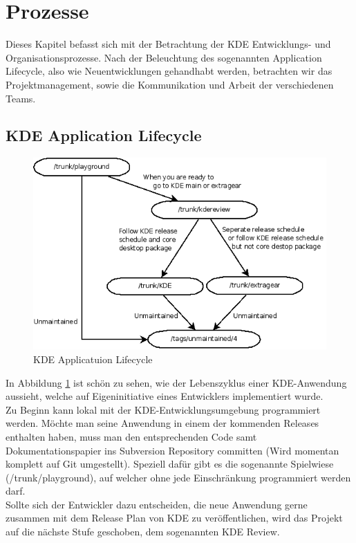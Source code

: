 \documentclass[10pt,a4paper,twocolumn]{article}
\begin{document}
	
\section{Prozesse}
Dieses Kapitel befasst sich mit der Betrachtung der KDE Entwicklungs- und Organisationsprozesse. Nach der Beleuchtung des sogenannten Application Lifecycle, also wie Neuentwicklungen gehandhabt werden, betrachten wir das Projektmanagement, sowie die Kommunikation und Arbeit der verschiedenen Teams.

\subsection{KDE Application Lifecycle \cite{ApplLife}} 
\begin{figure}[h]
	\centering
	\includegraphics[width=\columnwidth]{images/KDE_application_lifecycle.png}
	\caption{KDE Applicatuion Lifecycle \cite{ApplLife}}
	\label{fig:kde_applLife}
\end{figure}
In Abbildung \ref{fig:kde_applLife} ist schön zu sehen, wie der Lebenszyklus einer KDE-Anwendung aussieht, welche auf Eigeninitiative eines Entwicklers implementiert wurde.\\
Zu Beginn kann lokal mit der KDE-Entwicklungsumgebung programmiert werden. Möchte man seine Anwendung in einem der kommenden Releases enthalten haben, muss man den entsprechenden Code samt Dokumentationspapier ins Subversion Repository committen (Wird momentan komplett auf Git umgestellt). Speziell dafür gibt es die sogenannte Spielwiese (/trunk/playground), auf welcher ohne jede Einschränkung programmiert werden darf.\\
Sollte sich der Entwickler dazu entscheiden, die neue Anwendung gerne zusammen mit dem Release Plan von KDE zu veröffentlichen, wird das Projekt auf die nächste Stufe geschoben, dem sogenannten KDE Review.\\
\end{document}

